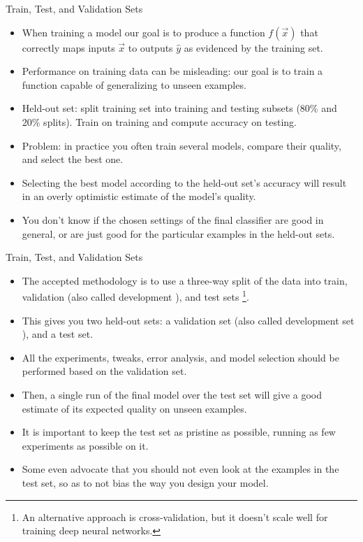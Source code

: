 \documentclass[handout]{beamer}
\begin{document}
\begin{frame}{Train, Test, and Validation Sets}
\begin{scriptsize}
\begin{itemize}
\item When training a model our goal is to produce a function $f(\vec{x})$ that correctly maps inputs $\vec{x}$ to outputs $\hat{y}$ as evidenced by the training set.
\item Performance on training data can be misleading: our goal is to train a function capable of generalizing to unseen examples.  
\item Held-out set: split training set into training and testing subsets (80\% and 20\% splits). Train on training and compute accuracy on testing.
\item Problem: in practice you often train several models, compare their quality, and select the best one. 
\item Selecting the best model according to the held-out set's accuracy will result in an overly optimistic estimate of the model's quality.
\item You don't know if the chosen settings of the final classifier are good in general, or are just good for the particular examples in the held-out sets.

\end{itemize}
\end{scriptsize}
\end{frame}


\begin{frame}{Train, Test, and Validation Sets}
\begin{scriptsize}
\begin{itemize}
\item The accepted methodology is to use a three-way split of the data into train, validation (also called development ), and test sets \footnote{An alternative approach is cross-validation, but it doesn't scale well for training deep neural networks.}. 
\item This gives you two held-out sets: a validation set (also called development set ), and a test set.
\item All the experiments, tweaks, error analysis, and model selection should be performed based on the validation set. 
\item Then, a single run of the final model over the test set will give a good estimate of its expected quality on unseen examples. 
\item It is important to keep the test set as pristine as possible, running as few experiments as possible on it. 
\item Some even advocate that you should not even look at the examples in the test
set, so as to not bias the way you design your model.



\end{itemize}

\end{scriptsize}
\end{frame}
\end{document}

